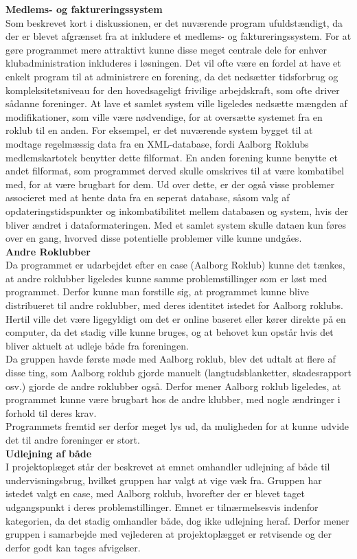 \textbf{Medlems- og faktureringssystem}\\
Som beskrevet kort i diskussionen, er det nuværende program ufuldstændigt, da der er blevet afgrænset fra at inkludere et medlems- og faktureringssystem. For at gøre programmet mere attraktivt kunne disse meget centrale dele for enhver klubadministration inkluderes i løsningen. Det vil ofte være en fordel at have et enkelt program til at administrere en forening, da det nedsætter tidsforbrug og kompleksitetsniveau for den hovedsageligt frivilige arbejdskraft, som ofte driver sådanne foreninger. At lave et samlet system ville ligeledes nedsætte mængden af modifikationer, som ville være nødvendige, for at oversætte systemet fra en roklub til en anden. For eksempel, er det nuværende system bygget til at modtage regelmæssig data fra en XML-database, fordi Aalborg Roklubs medlemskartotek benytter dette filformat. En anden forening kunne benytte et andet filformat, som programmet derved skulle omskrives til at være kombatibel med, for at være brugbart for dem. Ud over dette, er der også visse problemer associeret med at hente data fra en seperat database, såsom valg af opdateringstidspunkter og inkombatibilitet mellem databasen og system, hvis der bliver ændret i dataformateringen. Med et samlet system skulle dataen kun føres over en gang, hvorved disse potentielle problemer ville kunne undgåes. \\

\textbf{Andre Roklubber}\\
Da programmet er udarbejdet efter en case (Aalborg Roklub) kunne det tænkes, at andre roklubber ligeledes kunne samme problemstillinger som er løst med programmet. Derfor kunne man forstille sig, at programmet kunne blive distribueret til andre roklubber, med deres identitet istedet for Aalborg roklubs. Hertil ville det være ligegyldigt om det er online baseret eller kører direkte på en computer, da det stadig ville kunne bruges, og at behovet kun opstår hvis det bliver aktuelt at udleje både fra foreningen.\\

Da gruppen havde første møde med Aalborg roklub, blev det udtalt at flere af disse ting, som Aalborg roklub gjorde manuelt (langtudsblanketter, skadesrapport osv.) gjorde de andre roklubber også. Derfor mener Aalborg roklub ligeledes, at programmet kunne være brugbart hos de andre klubber, med nogle ændringer i forhold til deres krav.\\

Programmets fremtid ser derfor meget lys ud, da muligheden for at kunne udvide det til andre foreninger er stort.\\

\textbf{Udlejning af både}\\
I projektoplæget står der beskrevet at emnet omhandler udlejning af både til undervisningsbrug, hvilket gruppen har valgt at vige væk fra. Gruppen har istedet valgt en case, med Aalborg roklub, hvorefter der er blevet taget udgangspunkt i deres problemstillinger. Emnet er tilnærmelsesvis indenfor kategorien, da det stadig omhandler både, dog ikke udlejning heraf. Derfor mener gruppen i samarbejde med vejlederen at projektoplægget er retvisende og der derfor godt kan tages afvigelser.\\